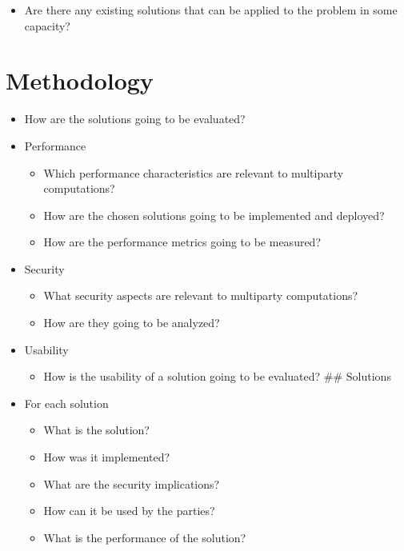 \begin{itemize}
\tightlist
\item
  Are there any existing solutions that can be applied to the problem in
  some capacity?
\end{itemize}

\hypertarget{methodology}{%
\section{Methodology}\label{methodology}}

\begin{itemize}
\tightlist
\item
  How are the solutions going to be evaluated?
\item
  Performance

  \begin{itemize}
  \tightlist
  \item
    Which performance characteristics are relevant to multiparty
    computations?
  \item
    How are the chosen solutions going to be implemented and deployed?
  \item
    How are the performance metrics going to be measured?
  \end{itemize}
\item
  Security

  \begin{itemize}
  \tightlist
  \item
    What security aspects are relevant to multiparty computations?
  \item
    How are they going to be analyzed?
  \end{itemize}
\item
  Usability

  \begin{itemize}
  \tightlist
  \item
    How is the usability of a solution going to be evaluated? \#\#
    Solutions
  \end{itemize}
\item
  For each solution

  \begin{itemize}
  \tightlist
  \item
    What is the solution?
  \item
    How was it implemented?
  \item
    What are the security implications?
  \item
    How can it be used by the parties?
  \item
    What is the performance of the solution?
  \end{itemize}
\end{itemize}

